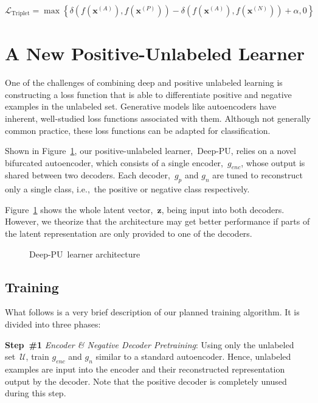 \documentclass[10pt]{article}
\newcommand{\toolname}{Deep-PU}
\newcommand{\xI}[1]{\mathbf{x}^{(#1)}}
\newcommand{\puDist}[2]{\delta\left(#1, #2\right)}
\newcommand{\nnDist}[3]{\puDist{#1\left(#2\right)}{#1\left(#3\right)}}
\newcommand{\lTrip}{\mathcal{L}_{\text{Triplet}}}
\newcommand{\exA}{\xI{{A}}}
\newcommand{\exP}{\xI{{P}}}
\newcommand{\exN}{\xI{{N}}}
\begin{document}
  \begin{equation}\label{eq:TripletLoss}
    \lTrip = \max\left\{ \nnDist{f}{\exA}{\exP} - \nnDist{f}{\exA}{\exN} + \alpha, 0 \right\}
  \end{equation}

\section{A New Positive-Unlabeled Learner}\label{sec:DeepPU}

One of the challenges of combining deep and positive unlabeled learning is constructing a loss function that is able to differentiate positive and negative examples in the unlabeled set.  Generative models like autoencoders have inherent, well-studied loss functions associated with them.  Although not generally common practice, these loss functions can be adapted for classification.

Shown in Figure~\ref{fig:DeepPU}, our positive-unlabeled learner,~\toolname, relies on a novel bifurcated autoencoder, which consists of a single encoder,~$g_{enc}$, whose output is shared between two decoders.   Each decoder,~$g_{p}$ and $g_{n}$ are tuned to reconstruct only a single class, i.e.,~the positive or negative class respectively.

Figure~\ref{fig:DeepPU} shows the whole latent vector,~$\mathbf{z}$, being input into both decoders.  However, we theorize that the architecture may get better performance if parts of the latent representation are only provided to one of the decoders.

\begin{figure}[t]
  \centering
  
  \caption{\toolname\ learner architecture}\label{fig:DeepPU}
\end{figure}

\subsection{Training}

What follows is a very brief description of our planned training algorithm.  It is divided into three phases:

\vspace{6pt}
\noindent
\textbf{Step~\#1} \textit{Encoder \& Negative Decoder Pretraining}: Using only the unlabeled set~$\mathcal{U}$, train $g_{enc}$ and $g_{n}$ similar to a standard autoencoder.  Hence, unlabeled examples are input into the encoder and their reconstructed representation output by the decoder.  Note that the positive decoder is completely unused during this step.
\end{document}
